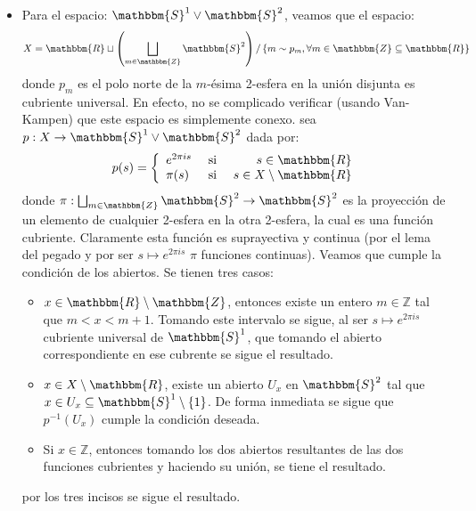\documentclass[12pt]{report}
\newcounter{it}
\theoremstyle{largebreak}
\newcommand\cf[3]{\ensuremath{#1:#2\rightarrow#3}}
\newcommand{\bbm}[1]{\ensuremath{\mathbbm{#1}}}
\begin{document}
\begin{sol}
\begin{itemize}
            \item Para el espacio: $\bbm{S}^1\lor\bbm{S}^2$, veamos que el espacio:
            \begin{equation*}
                X=\bbm{R}\sqcup\left(\bigsqcup_{ m\in\bbm{Z}}\bbm{S}^2  \right)/\left\{m\sim p_m,\forall m\in\bbm{Z}\subseteq\bbm{R} \right\}
            \end{equation*}
            donde $p_m$ es el polo norte de la $m$-ésima 2-esfera en la unión disjunta es cubriente universal. En efecto, no se complicado verificar (usando Van-Kampen) que este espacio es simplemente conexo. sea $\cf{p}{X}{\bbm{S}^1\lor\bbm{S}^2}$ dada por:
            \begin{equation*}
                p(s)=\left\{
                    \begin{array}{lcr}
                        e^{ 2\pi is} & \textup{ si } & s\in\bbm{R} \\
                        \pi(s) & \textup{ si } & s\in X\setminus\bbm{R}\\
                    \end{array}
                \right.
            \end{equation*}
            donde $\cf{\pi}{\bigsqcup_{ m\in\bbm{Z}}\bbm{S}^2}{\bbm{S}^2}$ es la proyección de un elemento de cualquier 2-esfera en la otra 2-esfera, la cual es una función cubriente. Claramente esta función es suprayectiva y continua (por el lema del pegado y por ser $s\mapsto e^{2\pi is}$ $\pi$ funciones continuas). Veamos que cumple la condición de los abiertos. Se tienen tres casos:
            \begin{itemize}
                \item $x\in\bbm{R}\setminus\bbm{Z}$, entonces existe un entero $m\in\mathbb{Z}$ tal que $m<x<m+1$. Tomando este intervalo se sigue, al ser $s\mapsto e^{ 2\pi is}$ cubriente universal de $\bbm{S}^1$, que tomando el abierto correspondiente en ese cubrente se sigue el resultado.
                \item $x\in X\setminus\bbm{R}$, existe un abierto $U_x$ en $\bbm{S}^2$ tal que $x\in U_x\subseteq\bbm{S}^1\setminus\left\{1\right\}$. De forma inmediata se sigue que $p^{-1}(U_x)$ cumple la condición deseada.
                \item Si $x\in\mathbb{Z}$, entonces tomando los dos abiertos resultantes de las dos funciones cubrientes y haciendo su unión, se tiene el resultado.
            \end{itemize}
            por los tres incisos se sigue el resultado.
        \end{itemize}
    \end{sol}
\end{document}
